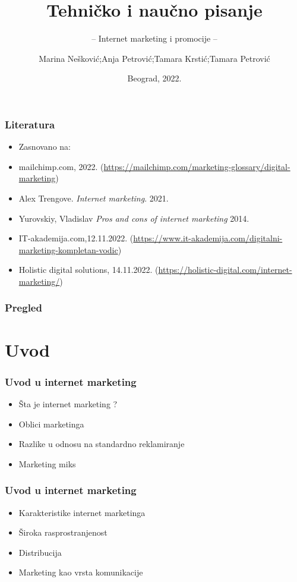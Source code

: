 \documentclass{beamer}
\title{Tehničko i naučno pisanje}
\subtitle{-- Internet marketing i promocije --}
\author{Marina Nešković;Anja Petrović;Tamara Krstić;Tamara Petrović}
\institute{Matematički fakultet\\Univerzitet u Beogradu}
\date{
	\footnotesize{Beograd, 2022.}	
}
\begin{document}
\begin{frame}
	\thispagestyle{empty}
	\titlepage
\end{frame}

\addtocounter{framenumber}{-1}

\begin{frame}[fragile]\frametitle{Literatura}
	\begin{itemize}
		\item Zasnovano na:\\
	\item mailchimp.com, 2022.
	(\url{https://mailchimp.com/marketing-glossary/digital-marketing})
        \item  Alex Trengove. \emph{Internet marketing}. 2021.
        \item Yurovskiy, Vladislav \emph{Pros and cons of internet marketing} 2014.
        \item IT-akademija.com,12.11.2022.
        (\url{https://www.it-akademija.com/digitalni-marketing-kompletan-vodic})
        \item Holistic digital solutions, 14.11.2022.
        (\url{https://holistic-digital.com/internet-marketing/})
	\end{itemize}
\end{frame}

\begin{frame}
	\frametitle{Pregled} %
	\tableofcontents[hidesubsections] 
\end{frame}
\section{Uvod}

\begin{frame}[fragile]\frametitle{Uvod u internet marketing}
	\begin{itemize}	
		\item  Šta je internet marketing ?
		\item  Oblici marketinga
		\item  Razlike u odnosu na standardno reklamiranje 
		\item  Marketing miks
	\end{itemize}
\end{frame}
\begin{frame}[fragile]\frametitle{Uvod u internet marketing}
	\begin{itemize}	
		\item  Karakteristike internet marketinga
         \item  Široka rasprostranjenost
		\item  Distribucija
		\item  Marketing kao vrsta komunikacije 
	\end{itemize}
\end{frame}
\end{document}

